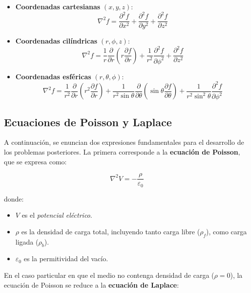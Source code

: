 \documentclass[
  11pt,
  letterpaper,
   answers
  ]{exam}
\begin{document}
\begin{itemize}
    \item \textbf{Coordenadas cartesianas} $(x,y,z)$:
    \[
    \nabla^2 f = \frac{\partial^2 f}{\partial x^2}
               + \frac{\partial^2 f}{\partial y^2}
               + \frac{\partial^2 f}{\partial z^2}
    \]

    \item \textbf{Coordenadas cilíndricas} $(r,\phi,z)$:
    \[
    \nabla^2 f = \frac{1}{r} \frac{\partial}{\partial r}
    \left( r \frac{\partial f}{\partial r} \right)
    + \frac{1}{r^2} \frac{\partial^2 f}{\partial \phi^2}
    + \frac{\partial^2 f}{\partial z^2}
    \]

    \item \textbf{Coordenadas esféricas} $(r,\theta,\phi)$:
    \[
    \nabla^2 f =
    \frac{1}{r^2} \frac{\partial}{\partial r}
    \left( r^2 \frac{\partial f}{\partial r} \right)
    + \frac{1}{r^2 \sin\theta} \frac{\partial}{\partial \theta}
    \left( \sin\theta \frac{\partial f}{\partial \theta} \right)
    + \frac{1}{r^2 \sin^2\theta} \frac{\partial^2 f}{\partial \phi^2}
    \]
\end{itemize}

\subsection*{Ecuaciones de Poisson y Laplace}

A continuación, se enuncian dos expresiones fundamentales para el desarrollo de los problemas posteriores.  
La primera corresponde a la \textbf{ecuación de Poisson}, que se expresa como:

\begin{equation}
\nabla^{2} V = -\frac{\rho}{\varepsilon_{0}}
\end{equation}

donde:
\begin{itemize}
    \item $V$ es el \textit{potencial eléctrico}.
    \item $\rho$ es la densidad de carga total, incluyendo tanto carga libre ($\rho_f$), como carga ligada ($\rho_b$).
    \item $\varepsilon_{0}$ es la permitividad del vacío.
\end{itemize}

En el caso particular en que el medio no contenga densidad de carga ($\rho = 0$), la ecuación de Poisson se reduce a la \textbf{ecuación de Laplace}:
\end{document}
